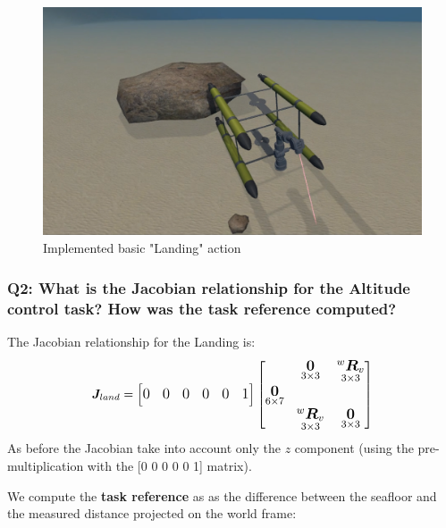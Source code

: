 \documentclass{article}
\begin{document}
\begin{figure}[h]
    \centering
    \includegraphics[scale=0.4]{211_Landing.png}
    \caption{Implemented basic "Landing" action}
    \label{images_2_3_1}
\end{figure}

\subsubsection{Q2: What is the Jacobian relationship for the Altitude control task? How was the task reference computed?}

\noindent
\vspace{5px}
The Jacobian relationship for the Landing is:
\begin{equation}
\large
\boldsymbol{J}_{land}=\begin{bmatrix} 0 & 0 & 0 & 0 & 0 & 1
\end{bmatrix}
    \begin{bmatrix}
     & \underset{3\times 3}{\boldsymbol{0}} & \underset{ 3\times 3}{^{w}\boldsymbol{R}_{v}} \\
     \underset{6\times 7}{\boldsymbol{0}} \\
     & \underset{ 3\times 3}{^{w}\boldsymbol{R}_{v}} & \underset{3\times 3}{\boldsymbol{0}} \\
    \end{bmatrix}
\end{equation}
As before the Jacobian take into account only the $z$ component (using the pre-multiplication with the [0 0 0 0 0 1] matrix).
 
\noindent
\vspace{5px}
We compute the \textbf{task reference} as as the difference between the seafloor and the measured distance projected on the world frame:
\end{document}
